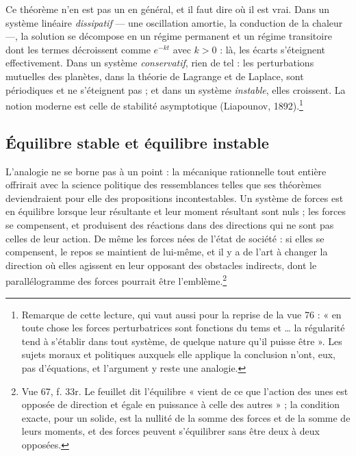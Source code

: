 \documentclass[11pt,a4paper]{article}
\begin{document}
Ce théorème n'en est pas un en général, et il faut dire où il est vrai. Dans un
système linéaire \emph{dissipatif} — une oscillation amortie, la conduction de
la chaleur —, la solution se décompose en un régime permanent et un régime
transitoire dont les termes décroissent comme $e^{-kt}$ avec $k > 0$ : là, les
écarts s'éteignent effectivement. Dans un système \emph{conservatif}, rien de
tel : les perturbations mutuelles des planètes, dans la théorie de Lagrange et
de Laplace, sont périodiques et ne s'éteignent pas ; et dans un système
\emph{instable}, elles croissent. La notion moderne est celle de stabilité
asymptotique (Liapounov, 1892).\footnote{Remarque de cette lecture, qui vaut
aussi pour la reprise de la vue 76 : « en toute chose les forces perturbatrices
sont fonctions du tems et \ldots{} la régularité tend à s'établir dans tout
système, de quelque nature qu'il puisse être ». Les sujets moraux et politiques
auxquels elle applique la conclusion n'ont, eux, pas d'équations, et
l'argument y reste une analogie.}

\subsection*{Équilibre stable et équilibre instable}

L'analogie ne se borne pas à un point : la mécanique rationnelle tout entière
offrirait avec la science politique des ressemblances telles que ses théorèmes
deviendraient pour elle des propositions incontestables. Un système de forces
est en équilibre lorsque leur résultante et leur moment résultant sont nuls ;
les forces se compensent, et produisent des réactions dans des directions qui ne
sont pas celles de leur action. De même les forces nées de l'état de société : si
elles se compensent, le repos se maintient de lui-même, et il y a de l'art à
changer la direction où elles agissent en leur opposant des obstacles indirects,
dont le parallélogramme des forces pourrait être l'emblème.\footnote{Vue 67,
f. 33r. Le feuillet dit l'équilibre « vient de ce que l'action des unes est
opposée de direction et égale en puissance à celle des autres » ; la condition
exacte, pour un solide, est la nullité de la somme des forces et de la somme de
leurs moments, et des forces peuvent s'équilibrer sans être deux à deux
opposées.}
\end{document}
